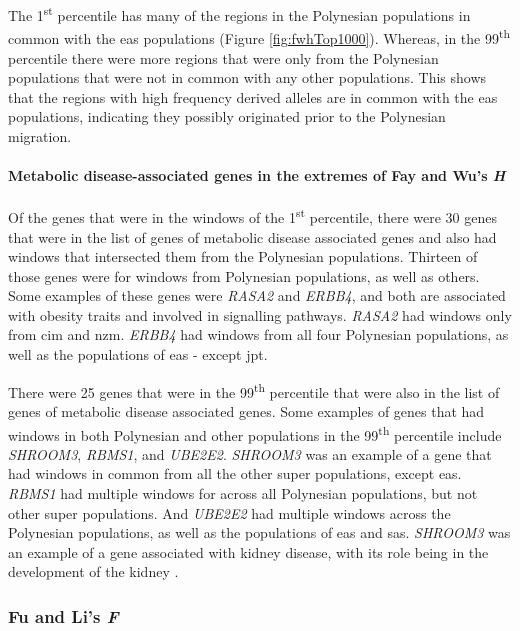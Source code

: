 \documentclass[]{report}
\let\oldparagraph\paragraph
\renewcommand{\paragraph}[1]{\oldparagraph{#1}\mbox{}}
\begin{document}
The 1\textsuperscript{st} percentile has many of the regions in the
Polynesian populations in common with the \gls{eas} populations (Figure
\ref{fig:fwhTop1000}). Whereas, in the 99\textsuperscript{th} percentile
there were more regions that were only from the Polynesian populations
that were not in common with any other populations. This shows that the
regions with high frequency derived alleles are in common with the
\gls{eas} populations, indicating they possibly originated prior to the
Polynesian migration.

\paragraph{\texorpdfstring{Metabolic disease-associated genes in the
extremes of Fay and Wu's
\emph{H}}{Metabolic disease-associated genes in the extremes of Fay and Wu's H}}\label{metabolic-disease-associated-genes-in-the-extremes-of-fay-and-wus-h}

Of the genes that were in the windows of the 1\textsuperscript{st}
percentile, there were 30 genes that were in the list of genes of
metabolic disease associated genes and also had windows that intersected
them from the Polynesian populations. Thirteen of those genes were for
windows from Polynesian populations, as well as others. Some examples of
these genes were \emph{RASA2} and \emph{ERBB4}, and both are associated
with obesity traits and involved in signalling pathways. \emph{RASA2}
had windows only from \gls{cim} and \gls{nzm}. \emph{ERBB4} had windows
from all four Polynesian populations, as well as the populations of
\gls{eas} - except \gls{jpt}.

There were 25 genes that were in the 99\textsuperscript{th} percentile
that were also in the list of genes of metabolic disease associated
genes. Some examples of genes that had windows in both Polynesian and
other populations in the 99\textsuperscript{th} percentile include
\emph{SHROOM3}, \emph{RBMS1}, and \emph{UBE2E2}. \emph{SHROOM3} was an
example of a gene that had windows in common from all the other super
populations, except \gls{eas}. \emph{RBMS1} had multiple windows for
across all Polynesian populations, but not other super populations. And
\emph{UBE2E2} had multiple windows across the Polynesian populations, as
well as the populations of \gls{eas} and \gls{sas}. \emph{SHROOM3} was
an example of a gene associated with kidney disease, with its role being
in the development of the kidney \citep{Khalili2016}.

\subsubsection{\texorpdfstring{Fu and Li's
\emph{F}}{Fu and Li's F}}\label{fu-and-lis-f-1}
\end{document}
